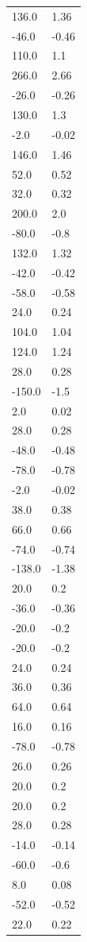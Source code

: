 \begin{longtable}{ll}
136.0 & 1.36 \\
-46.0 & -0.46 \\
110.0 & 1.1 \\
266.0 & 2.66 \\
-26.0 & -0.26 \\
130.0 & 1.3 \\
-2.0 & -0.02 \\
146.0 & 1.46 \\
52.0 & 0.52 \\
32.0 & 0.32 \\
200.0 & 2.0 \\
-80.0 & -0.8 \\
132.0 & 1.32 \\
-42.0 & -0.42 \\
-58.0 & -0.58 \\
24.0 & 0.24 \\
104.0 & 1.04 \\
124.0 & 1.24 \\
28.0 & 0.28 \\
-150.0 & -1.5 \\
2.0 & 0.02 \\
28.0 & 0.28 \\
-48.0 & -0.48 \\
-78.0 & -0.78 \\
-2.0 & -0.02 \\
38.0 & 0.38 \\
66.0 & 0.66 \\
-74.0 & -0.74 \\
-138.0 & -1.38 \\
20.0 & 0.2 \\
-36.0 & -0.36 \\
-20.0 & -0.2 \\
-20.0 & -0.2 \\
24.0 & 0.24 \\
36.0 & 0.36 \\
64.0 & 0.64 \\
16.0 & 0.16 \\
-78.0 & -0.78 \\
26.0 & 0.26 \\
20.0 & 0.2 \\
20.0 & 0.2 \\
28.0 & 0.28 \\
-14.0 & -0.14 \\
-60.0 & -0.6 \\
8.0 & 0.08 \\
-52.0 & -0.52 \\
22.0 & 0.22 \\

\end{longtable}
